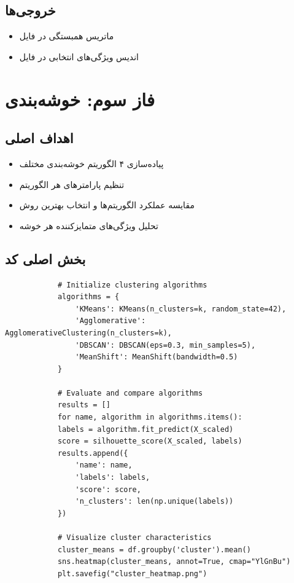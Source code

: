 \documentclass[a4paper,12pt]{article}
\let\nobreaksection\section
\renewcommand{\section}{\nobreaksection}  %
\begin{document}
	\subsection{خروجی‌ها}
	\begin{itemize}
		\item ماتریس همبستگی در فایل 
		\item اندیس ویژگی‌های انتخابی در فایل 
	\end{itemize}
	
	
	\section{فاز سوم: خوشه‌بندی}
	
	\subsection{اهداف اصلی}
	\begin{itemize}
		\item پیاده‌سازی ۴ الگوریتم خوشه‌بندی مختلف
		\item تنظیم پارامترهای هر الگوریتم
		\item مقایسه عملکرد الگوریتم‌ها و انتخاب بهترین روش
		\item تحلیل ویژگی‌های متمایزکننده هر خوشه
	\end{itemize}
	
	\subsection{بخش اصلی کد}
	\begin{latin}
		\begin{verbatim}
			# Initialize clustering algorithms
			algorithms = {
				'KMeans': KMeans(n_clusters=k, random_state=42),
				'Agglomerative': AgglomerativeClustering(n_clusters=k),
				'DBSCAN': DBSCAN(eps=0.3, min_samples=5),
				'MeanShift': MeanShift(bandwidth=0.5)
			}
			
			# Evaluate and compare algorithms
			results = []
			for name, algorithm in algorithms.items():
			labels = algorithm.fit_predict(X_scaled)
			score = silhouette_score(X_scaled, labels)
			results.append({
				'name': name,
				'labels': labels,
				'score': score,
				'n_clusters': len(np.unique(labels))
			})
			
			# Visualize cluster characteristics
			cluster_means = df.groupby('cluster').mean()
			sns.heatmap(cluster_means, annot=True, cmap="YlGnBu")
			plt.savefig("cluster_heatmap.png")
		\end{verbatim}
	\end{latin}
	
\end{document}
